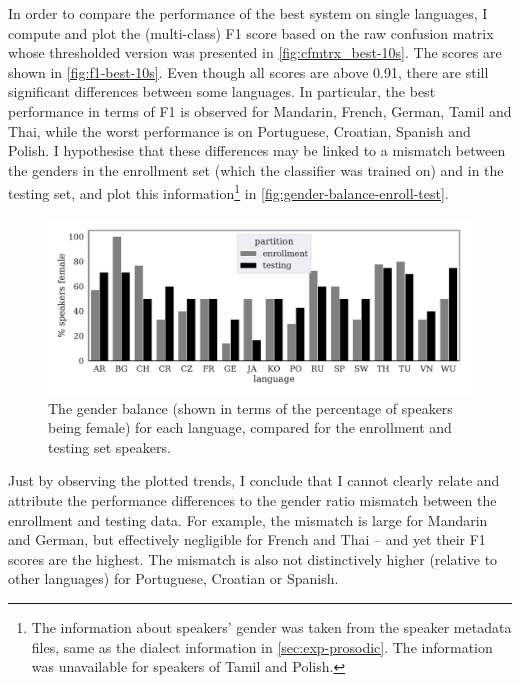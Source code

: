 \documentclass[bsc,frontabs,twoside,singlespacing,parskip,deptreport]{infthesis}
\begin{document}
{{    In order to compare the performance of the best system on single languages, I compute and plot the (multi-class) F1 score based on the raw confusion matrix whose thresholded version was presented in \autoref{fig:cfmtrx_best-10s}. The scores are shown in \autoref{fig:f1-best-10s}. Even though all scores are above 0.91, there are still significant differences between some languages. In particular, the best performance in terms of F1 is observed for Mandarin, French, German, Tamil and Thai, while the worst performance is on Portuguese, Croatian, Spanish and Polish. I hypothesise that these differences may be linked to a mismatch between the genders in the enrollment set (which the classifier was trained on) and in the testing set, and plot this information\footnote{The information about speakers' gender was taken from the speaker metadata files, same as the dialect information in \autoref{sec:exp-prosodic}. The information was unavailable for speakers of Tamil and Polish.} in \autoref{fig:gender-balance-enroll-test}.
    \begin{figure}[h!t]
      \centering
      \includegraphics[width=13cm]{../img/sex-balance.pdf}
      \vspace*{-1.2em}
      \caption{The gender balance (shown in terms of the percentage of speakers being female) for each language, compared for the enrollment and testing set speakers.}
      \label{fig:gender-balance-enroll-test}
    \end{figure}
    Just by observing the plotted trends, I conclude that I cannot clearly relate and attribute the performance differences to the gender ratio mismatch between the enrollment and testing data. For example, the mismatch is large for Mandarin and German, but effectively negligible for French and Thai -- and yet their F1 scores are the highest. The mismatch is also not distinctively higher (relative to other languages) for Portuguese, Croatian or Spanish.

}}
\end{document}

